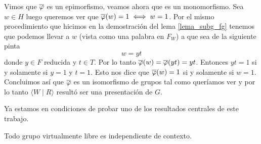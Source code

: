 \documentclass[tesis.tex]{subfiles}
\begin{document}
\begin{obs}
	Vimos que $\overline \varphi$ es un epimorfismo, veamos ahora que es un monomorfismo.
	Sea $w \in H$ luego queremos ver que $\overline \varphi(w) = 1 \iff w = 1$.
	Por el mismo procedimiento que hicimos en la demostración del lema \ref{lema_subg_fg} tenemos que podemos llevar a $w$ (vista como una palabra en $F_{W}$) a que sea de la siguiente pinta
	\[
		w = yt
	\]
	donde $y \in F$ reducida y $t \in T$.
	Por lo tanto $\overline \varphi (w) = \overline \varphi(yt) = yt$.
	Entonces $yt=1$ si y solamente si $y=1$ y $t=1$. 
	Esto nos dice que $\overline \varphi(w) = 1$ si y solamente si $w=1$. 
	Concluimos así que $\overline \varphi$ es un isomorfismo de grupos tal como queríamos ver y por lo tanto  $\langle W \mid R \rangle$ resultó ser una presentación de $G$.
\end{obs}
\medskip

Ya estamos en condiciones de probar uno de los resultados centrales de este trabajo.



\begin{teo}\label{teo_Muller_Schupp}\cite{muller1983groups}
	Todo grupo virtualmente libre es independiente de contexto.
\end{teo}
\end{document}
